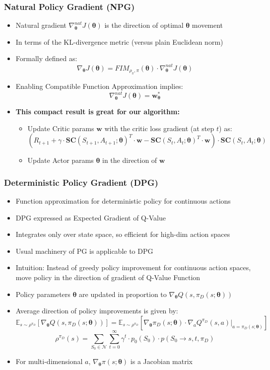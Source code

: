 \documentclass[handout]{beamer}
\begin{document}
\begin{frame}
\frametitle{Natural Policy Gradient (NPG)}
\pause
\begin{itemize}[<+->]
\item Natural gradient $\nabla_{\bm{\theta}}^{nat} J(\bm{\theta})$ is the direction of optimal $\bm{\theta}$ movement
\item In terms of the KL-divergence metric (versus plain Euclidean norm)
\item Formally defined as:
$$\nabla_{\bm{\theta}} J(\bm{\theta}) = FIM_{\rho_{\pi}, \pi}(\bm{\theta}) \cdot \nabla_{\bm{\theta}}^{nat} J(\bm{\theta}) $$
\item Enabling Compatible Function Approximation implies:
$$\nabla_{\bm{\theta}}^{nat} J(\bm{\theta}) = \bm{w_{\theta}^*}$$
\item {\bf This compact result is great for our algorithm:}
\begin{itemize}[<+->]
\item Update Critic params $\bm{w}$ with the critic loss gradient (at step $t$) as:
$$(R_{t+1} + \gamma \cdot \bm{SC}(S_{t+1}, A_{t+1}; \bm{\theta})^T \cdot \bm{w} - \bm{SC}(S_t,A_t; \bm{\theta})^T \cdot \bm{w}) \cdot \bm{SC}(S_t,A_t; \bm{\theta})$$
\item Update Actor params $\bm{\theta}$ in the direction of $\bm{w}$
\end{itemize}
\end{itemize}
\end{frame}



\begin{frame}
\frametitle{Deterministic Policy Gradient (DPG)}
\begin{itemize}
\item Function approximation for deterministic policy for continuous actions
\item DPG expressed as Expected Gradient of Q-Value
\item Integrates only over state space, so efficient for high-dim action spaces
\item Usual machinery of PG is applicable to DPG
\item Intuition: Instead of greedy policy improvement for continuous action spaces, move policy in the direction of gradient of Q-Value Function
\item Policy parameters $\bm{\theta}$ are updated in proportion to $\nabla_{\bm{\theta}} Q(s,\pi_D(s;\bm{\theta}))$
\item Average direction of policy improvements is given by: 
$$\mathbb{E}_{s \sim \rho^{\pi_D}}[\nabla_{\bm{\theta}} Q(s,\pi_D(s; \bm{\theta}))] = \mathbb{E}_{s \sim \rho^{\pi_D}}[\nabla_{\bm{\theta}} \pi_D(s; \bm{\theta}) \cdot \nabla_a Q^{\pi_D}(s,a) \Bigr\rvert_{a=\pi_D(s;\bm{\theta})}]$$
$$\rho^{\pi_D}(s) = \sum_{S_0 \in \mathcal{N}}  \sum_{t=0}^\infty \gamma^t \cdot p_0(S_0) \cdot p(S_0 \rightarrow s, t, \pi_D)$$
\item For multi-dimensional $a$, $\nabla_{\bm{\theta}} \pi(s; \bm{\theta})$ is a Jacobian matrix
\end{itemize}
\end{frame}
\end{document}
